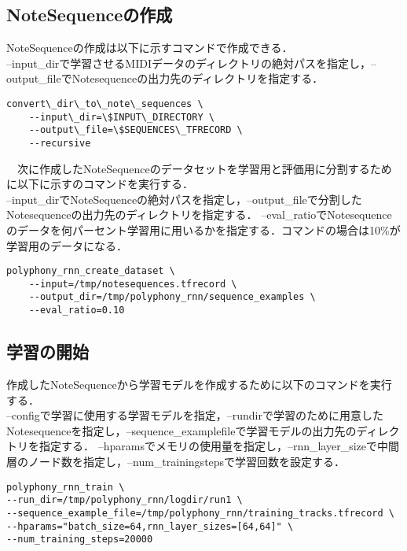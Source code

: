 \subsection{NoteSequenceの作成}
NoteSequenceの作成は以下に示すコマンドで作成できる．\\
--input\_dirで学習させるMIDIデータのディレクトリの絶対パスを指定し，--output\_fileでNotesequenceの出力先のディレクトリを指定する．\\
\begin{lstlisting}[basicstyle=\ttfamily\footnotesize,frame=single]
    convert\_dir\_to\_note\_sequences \
    --input\_dir=\$INPUT\_DIRECTORY \
    --output\_file=\$SEQUENCES\_TFRECORD \
    --recursive
\end{lstlisting}
　次に作成したNoteSequenceのデータセットを学習用と評価用に分割するために以下に示すのコマンドを実行する．\\
--input\_dirでNoteSequenceの絶対パスを指定し，--output\_fileで分割したNotesequenceの出力先のディレクトリを指定する．
--eval\_ratioでNotesequenceのデータを何パーセント学習用に用いるかを指定する．コマンドの場合は10\%が学習用のデータになる．
\begin{lstlisting}[basicstyle=\ttfamily\footnotesize,frame=single]
    polyphony_rnn_create_dataset \
    --input=/tmp/notesequences.tfrecord \
    --output_dir=/tmp/polyphony_rnn/sequence_examples \
    --eval_ratio=0.10
    \end{lstlisting}
\subsection{学習の開始}
作成したNoteSequenceから学習モデルを作成するために以下のコマンドを実行する．\\
--configで学習に使用する学習モデルを指定，--rundirで学習のために用意したNotesequenceを指定し，--sequence\_examplefileで学習モデルの出力先のディレクトリを指定する．
--hparamsでメモリの使用量を指定し，--rnn\_layer\_sizeで中間層のノード数を指定し，--num\_trainingstepsで学習回数を設定する．\\
\begin{lstlisting}[basicstyle=\ttfamily\footnotesize,frame=single]
polyphony_rnn_train \
--run_dir=/tmp/polyphony_rnn/logdir/run1 \
--sequence_example_file=/tmp/polyphony_rnn/training_tracks.tfrecord \
--hparams="batch_size=64,rnn_layer_sizes=[64,64]" \
--num_training_steps=20000
\end{lstlisting}

